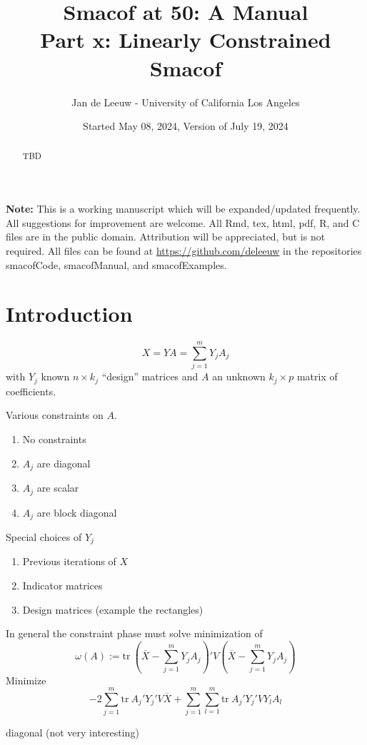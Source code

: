 \documentclass[
  12pt,
]{article}
\title{Smacof at 50: A Manual\\
Part x: Linearly Constrained Smacof}
\author{Jan de Leeuw - University of California Los Angeles}
\date{Started May 08, 2024, Version of July 19, 2024}
\providecommand{\tightlist}{%
  \setlength{\itemsep}{0pt}\setlength{\parskip}{0pt}}
\begin{document}
\maketitle
\begin{abstract}
TBD
\end{abstract}

{
\setcounter{tocdepth}{3}
\tableofcontents
}
\textbf{Note:} This is a working manuscript which will be expanded/updated
frequently. All suggestions for improvement are welcome. All Rmd, tex,
html, pdf, R, and C files are in the public domain. Attribution will be
appreciated, but is not required. All files can be found at
\url{https://github.com/deleeuw} in the repositories smacofCode, smacofManual,
and smacofExamples.

\section{Introduction}\label{introduction}

\[
X=YA=\sum_{j=1}^m Y_jA_j
\]
with \(Y_j\) known \(n\times k_j\) ``design'' matrices and \(A\)
an unknown \(k_j\times p\) matrix of coefficients.

Various constraints on \(A\).

\begin{enumerate}
\def\labelenumi{\arabic{enumi}.}
\tightlist
\item
  No constraints
\item
  \(A_j\) are diagonal
\item
  \(A_j\) are scalar
\item
  \(A_j\) are block diagonal
\end{enumerate}

Special choices of \(Y_j\)

\begin{enumerate}
\def\labelenumi{\arabic{enumi}.}
\tightlist
\item
  Previous iterations of \(X\)
\item
  Indicator matrices
\item
  Design matrices (example the rectangles)
\end{enumerate}

In general the constraint phase must solve minimization of
\[
\omega(A):=\text{tr}\ (\overline{X}-\sum_{j=1}^m Y_jA_j)'V(\overline{X}-\sum_{j=1}^m Y_jA_j)
\]
Minimize
\[
-2\sum_{j=1}^m \text{tr}\ A_j'Y_j'V\overline{X}+
\sum_{j=1}^m\sum_{l=1}^m\text{tr}\ A_j'Y_j'VY_l^{\ }A_l^{\ }
\]

diagonal (not very interesting)
\end{document}
